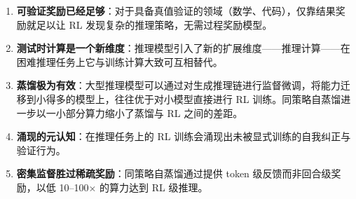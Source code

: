 \begin{enumerate}
  \item \textbf{可验证奖励已经足够}：对于具备真值验证的领域（数学、代码），仅靠结果奖励就足以让 RL 发现复杂的推理策略，无需过程奖励模型。
  \item \textbf{测试时计算是一个新维度}：推理模型引入了新的扩展维度——推理计算——在困难推理任务上它与训练计算大致可互相替代。
  \item \textbf{蒸馏极为有效}：大型推理模型可以通过对生成推理链进行监督微调，将能力迁移到小得多的模型上，往往优于对小模型直接进行 RL 训练。同策略自蒸馏进一步以一小部分算力缩小了蒸馏与 RL 之间的差距。
  \item \textbf{涌现的元认知}：在推理任务上的 RL 训练会涌现出未被显式训练的自我纠正与验证行为。
  \item \textbf{密集监督胜过稀疏奖励}：同策略自蒸馏通过提供 token 级反馈而非回合级奖励，以低 10--100$\times$ 的算力达到 RL 级推理。
\end{enumerate}

